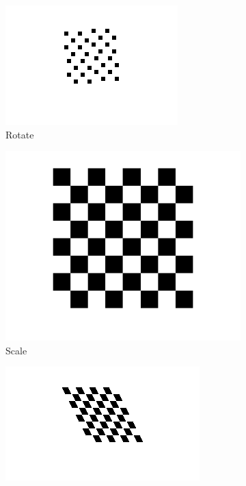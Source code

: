 \documentclass[a4paper,10pt]{article}
\begin{document}
\begin{figure}[h]
\begin{subfigure}[b]{.16\textwidth}
            \includegraphics[width=\textwidth]{rotate}
            \caption{Rotate}
            \label{fig:rot}
          \end{subfigure}
          \begin{subfigure}[b]{.16\textwidth}
            \includegraphics[width=\textwidth]{scale}
            \caption{Scale}
            \label{fig:scale}
          \end{subfigure}
          \begin{subfigure}[b]{.16\textwidth}
            \includegraphics[width=\textwidth]{skew}

\end{subfigure}
\end{figure}
\end{document}
